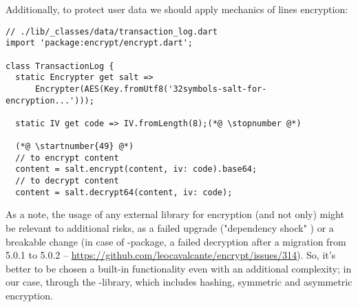 \noindent Additionally, to protect user data we should apply mechanics of lines encryption:

\begin{lstlisting}
// ./lib/_classes/data/transaction_log.dart
import 'package:encrypt/encrypt.dart';

class TransactionLog {
  static Encrypter get salt =>
      Encrypter(AES(Key.fromUtf8('32symbols-salt-for-encryption...')));

  static IV get code => IV.fromLength(8);(*@ \stopnumber @*)

  (*@ \startnumber{49} @*)
  // to encrypt content
  content = salt.encrypt(content, iv: code).base64;
  // to decrypt content
  content = salt.decrypt64(content, iv: code);
\end{lstlisting}

\noindent As a note, the usage of any external library for encryption (and not only) might be relevant to additional 
risks, as a failed upgrade ("dependency shock" \cite{Inki23}) or a breakable change (in case of -package, a 
failed decryption after a migration from 5.0.1 to 5.0.2 -- 
\href{https://github.com/leocavalcante/encrypt/issues/314}{https://github.com/leocavalcante/encrypt/issues/314}).
So, it's better to be chosen a built-in functionality even with an additional complexity; in our case, through the 
-library, which includes hashing, symmetric and asymmetric encryption.
